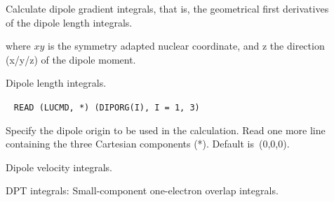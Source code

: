 \begin{description}
\item[]

Calculate dipole gradient integrals, that is, the geometrical first
derivatives of the dipole length integrals.

where $xy$ is the symmetry adapted nuclear coordinate, and z the
direction (x/y/z) of the dipole moment.

\item[] Dipole length integrals.


\item[]\verb| |\newline
\verb|READ (LUCMD, *) (DIPORG(I), I = 1, 3)|

Specify the dipole origin to be used in the
calculation. Read one more
line containing the three Cartesian components (*). Default is~(0,0,0).

\item[] Dipole velocity integrals.


\item[] DPT integrals: Small-component one-electron
overlap integrals.



\end{description}
